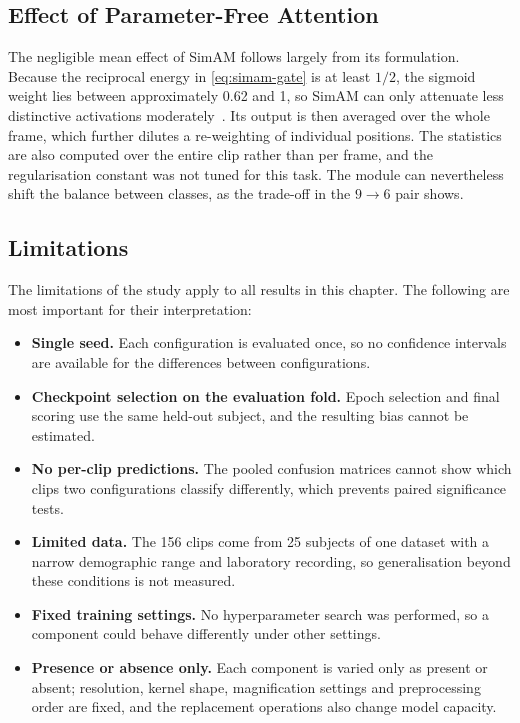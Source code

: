 \subsection{Effect of Parameter-Free Attention}
\label{sec:simam-discussion}

The negligible mean effect of SimAM follows largely from its formulation. Because the reciprocal energy in \eqref{eq:simam-gate} is at least $1/2$, the sigmoid weight lies between approximately 0.62 and 1, so SimAM can only attenuate less distinctive activations moderately~\cite{yang2021}. Its output is then averaged over the whole frame, which further dilutes a re-weighting of individual positions. The statistics are also computed over the entire clip rather than per frame, and the regularisation constant was not tuned for this task. The module can nevertheless shift the balance between classes, as the trade-off in the $9\rightarrow6$ pair shows.

\subsection{Limitations}
\label{sec:ch5-limitations}

The limitations of the study apply to all results in this chapter. The following are most important for their interpretation:

\begin{itemize}
	\item \textbf{Single seed.} Each configuration is evaluated once, so no confidence intervals are available for the differences between configurations.
	\item \textbf{Checkpoint selection on the evaluation fold.} Epoch selection and final scoring use the same held-out subject, and the resulting bias cannot be estimated.
	\item \textbf{No per-clip predictions.} The pooled confusion matrices cannot show which clips two configurations classify differently, which prevents paired significance tests.
	\item \textbf{Limited data.} The 156 clips come from 25 subjects of one dataset with a narrow demographic range and laboratory recording, so generalisation beyond these conditions is not measured.
	\item \textbf{Fixed training settings.} No hyperparameter search was performed, so a component could behave differently under other settings.
	\item \textbf{Presence or absence only.} Each component is varied only as present or absent; resolution, kernel shape, magnification settings and preprocessing order are fixed, and the replacement operations also change model capacity.
\end{itemize}


